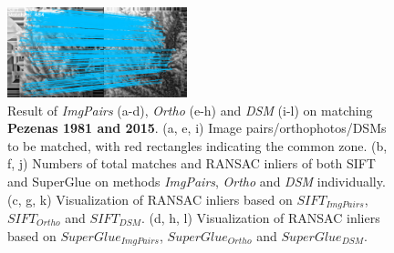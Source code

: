 \begin{figure}[htbp]
\begin{center}
{\begin{minipage}[t]{0.48\linewidth}
				\centering
				\includegraphics[width=5.2cm]{images/Chapitre3/Homol-SIFT2Step-Rough-2DRANSAC_MEC-Malt_Tapas_1981_MEC-Malt_2015.png}
			\end{minipage}%
		}
		\caption{{\scriptsize Result of \textit{ImgPairs} (a-d), \textit{Ortho} (e-h) and \textit{DSM} (i-l) on matching \textbf{Pezenas 1981 and 2015}. (a, e, i) Image pairs/orthophotos/DSMs to be matched, with red rectangles indicating the common zone. (b, f, j) Numbers of total matches and RANSAC inliers of both SIFT and SuperGlue on methods \textit{ImgPairs}, \textit{Ortho} and \textit{DSM} individually. (c, g, k) Visualization of RANSAC inliers based on $SIFT_{ImgPairs}$, $SIFT_{Ortho}$ and $SIFT_{DSM}$. (d, h, l) Visualization of RANSAC inliers based on $SuperGlue_{ImgPairs}$, $SuperGlue_{Ortho}$ and $SuperGlue_{DSM}$.}}        
		\label{MatchVizPezenas1981DSM}
	\end{center}
\end{figure} 



